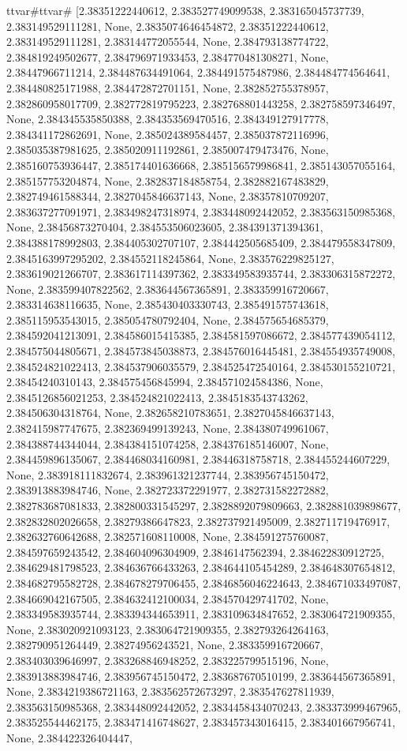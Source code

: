 \documentclass[
  11pt,
  french,
]{article}
\begin{document}
\begin{tcolorbox}[title= Répartition des volumes selon leurs caractéristiques ,colback=boitecode]
ttvar{#}ttvar{#} [2.38351222440612, 2.383527749099538, 2.383165045737739, 2.383149529111281, None, 2.3835074646454872, 2.38351222440612, 2.383149529111281, 2.383144772055544, None, 2.384793138774722, 2.384819249502677, 2.384796971933453, 2.384770481308271, None, 2.38447966711214, 2.384487634491064, 2.384491575487986, 2.384484774564641, 2.384480825171988, 2.384472872701151, None, 2.382852755378957, 2.382860958017709, 2.382772819795223, 2.382768801443258, 2.382758597346497, None, 2.384345535850388, 2.384353569470516, 2.384349127917778, 2.384341172862691, None, 2.385024389584457, 2.385037872116996, 2.385035387981625, 2.385020911192861, 2.385007479473476, None, 2.385160753936447, 2.385174401636668, 2.385156579986841, 2.385143057055164, 2.385157753204874, None, 2.382837184858754, 2.382882167483829, 2.382749461588344, 2.3827045846637143, None, 2.38357810709207, 2.383637277091971, 2.383498247318974, 2.383448092442052, 2.383563150985368, None, 2.38456873270404, 2.384553506023605, 2.384391371394361, 2.384388178992803, 2.384405302707107, 2.384442505685409, 2.384479558347809, 2.3845163997295202, 2.384552118245864, None, 2.383576229825127, 2.383619021266707, 2.383617114397362, 2.383349583935744, 2.383306315872272, None, 2.383599407822562, 2.383644567365891, 2.383359916720667, 2.383314638116635, None, 2.385430403330743, 2.385491575743618, 2.385115953543015, 2.385054780792404, None, 2.384575654685379, 2.384592041213091, 2.384586015415385, 2.384581597086672, 2.384577439054112, 2.384575044805671, 2.384573845038873, 2.384576016445481, 2.384554935749008, 2.384524821022413, 2.384537906035579, 2.384525472540164, 2.384530155210721, 2.38454240310143, 2.384575456845994, 2.384571024584386, None, 2.3845126856021253, 2.384524821022413, 2.3845183543743262, 2.384506304318764, None, 2.382658210783651, 2.3827045846637143, 2.382415987747675, 2.382369499139243, None, 2.384380749961067, 2.384388744344044, 2.384384151074258, 2.384376185146007, None, 2.384459896135067, 2.384468034160981, 2.38446318758718, 2.384455244607229, None, 2.383918111832674, 2.383961321237744, 2.383956745150472, 2.383913883984746, None, 2.382723372291977, 2.382731582272882, 2.382783687081833, 2.382800331545297, 2.3828892079809663, 2.382881039898677, 2.382832802026658, 2.38279386647823, 2.382737921495009, 2.382711719476917, 2.382632760642688, 2.382571608110008, None, 2.384591275760087, 2.384597659243542, 2.384604096304909, 2.3846147562394, 2.384622830912725, 2.384629481798523, 2.384636766433263, 2.384644105454289, 2.384648307654812, 2.384682795582728, 2.384678279706455, 2.3846856046224643, 2.384671033497087, 2.384669042167505, 2.384632412100034, 2.384570429741702, None, 2.383349583935744, 2.383394344653911, 2.383109634847652, 2.383064721909355, None, 2.383020921093123, 2.383064721909355, 2.382793264264163, 2.382790951264449, 2.38274956243521, None, 2.383359916720667, 2.383403039646997, 2.383268846948252, 2.383225799515196, None, 2.383913883984746, 2.383956745150472, 2.383687670510199, 2.383644567365891, None, 2.3834219386721163, 2.383562572673297, 2.383547627811939, 2.383563150985368, 2.383448092442052, 2.3834458434070243, 2.383373999467965, 2.383525544462175, 2.383471416748627, 2.383457343016415, 2.383401667956741, None, 2.384422326404447, 
\end{tcolorbox}
\end{document}
